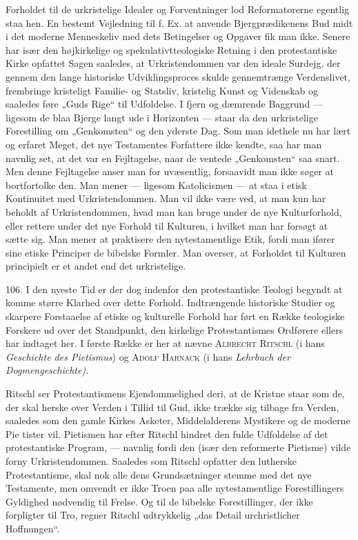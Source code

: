 \documentclass[12pt,a4paper,openany]{book}
\newcommand{\opage}[1]{\marginnote{\footnotesize\textit{[#1]}}}
\begin{document}
Forholdet til de urkristelige Idealer og Forventninger lod
Reformatorerne egentlig staa hen. En bestemt Vejledning til f. Ex. at
anvende Bjergprædikenens Bud midt i det moderne Menneskeliv med dets
Betingelser og Opgaver fik man ikke. Senere har især den højkirkelige og
spekulativtteologiske Retning i den protestantiske Kirke opfattet Sagen
saaledes, at Urkristendommen var den ideale Surdejg, der gennem den
lange historiske Udviklingsproces skulde gennemtrænge Verdenslivet,
frembringe kristeligt Familie- og Statsliv, kristelig Kunst og Videnskab
og saaledes føre „Guds Rige“ til Udfoldelse. I fjern og dæmrende
Baggrund --- ligesom de blaa Bjerge langt ude i Horizonten --- staar da
den urkristelige Forestilling om „Genkomsten“ og den yderste Dag. Som
man idethele nu har lært og erfaret Meget, det nye Testamentes
Forfattere ikke kendte, saa har man navnlig set, at det var en
Fejltagelse, naar de ventede „Genkomsten“ saa snart. Men denne
Fejltagelse anser man for uvæsentlig, forsaavidt man ikke søger at
bortfortolke den. Man mener --- ligesom Katolicismen --- at staa i etisk
Kontinuitet med Urkristendommen. Man vil ikke være ved, at man kun har
beholdt af Urkristendommen, hvad man kan bruge under de nye
Kulturforhold, eller rettere under det nye Forhold til Kulturen, i
hvilket man har forsøgt at sætte sig. Man mener at praktisere den
nytestamentlige Etik, fordi man ifører sine etiske Principer de bibelske
Formler. Man overser, at Forholdet til Kulturen principielt er et andet
end det urkristelige.

106. I den nyeste Tid er der dog indenfor den protestantiske Teologi
begyndt at komme større Klarhed over dette Forhold. Indtrængende
historiske Studier og skarpere Forstaaelse af etiske og kulturelle
Forhold har ført en Række teologiske Forskere ud over det Standpunkt,
den kirkelige Protestantismes Ordførere ellers har indtaget her. I
første Række er her at nævne \textsc{Albrecht Ritschl} (i hans
\textit{Geschichte des Pietismus}) og \textsc{Adolf Harnack} (i hans
\textit{Lehrbuch der Dogmengeschichte).}

Ritschl ser Protestantismens Ejendommelighed deri, at de Kristne staar
som de, der skal herske over Verden i Tillid til Gud, ikke trække sig
tilbage fra Verden, saaledes som den gamle Kirkes Asketer,
Middelalderens Mystikere og de moderne Pie%
\opage{235}tister vil. Pietismen har efter Ritschl hindret den fulde
Udfoldelse af det protestantiske Program, --- navnlig fordi den (især
den reformerte Pietisme) vilde forny Urkristendommen. Saaledes som
Ritschl opfatter den lutherske Protestantisme, skal nok alle dens
Grundsætninger stemme med det nye Testamente, men omvendt er ikke Troen
paa alle nytestamentlige Forestillingers Gyldighed nødvendig til Frelse.
Og til de bibelske Forestillinger, der ikke forpligter til Tro, regner
Ritschl udtrykkelig „das Detail urchristlicher Hoffnungen“.
\end{document}
